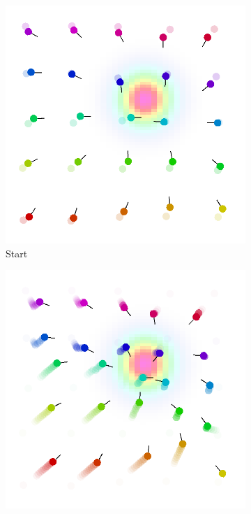 \begin{figure}[t]
	\centering
	\begin{subfigure}[b]{0.32\linewidth}
		\includegraphics[width=\textwidth]{papers/acsos2023/imgs/start.png}
		\caption{Start}
		\label{acsos2023:fig:initial}
	\end{subfigure}
	\begin{subfigure}[b]{0.32\linewidth}
		\includegraphics[width=\textwidth]{papers/acsos2023/imgs/after.png}

\end{subfigure}
\end{figure}
